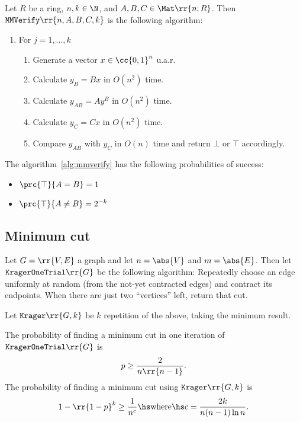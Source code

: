 \documentclass{article}
\begin{document}
\begin{algorithm}\label{alg:mmverify}
  Let $R$ be a ring, $n,k\in\N$, and $A,B,C\in\Mat \rr{ n; R }$. Then
  $\texttt{MMVerify} \rr{ n, A, B, C, k }$ is the following algorithm:
  \begin{enumerate}
    \item For $j=1,...,k$ \begin{enumerate}
      \item Generate a vector $x\in \cc{ 0,1 }^n$ u.a.r.
      \item Calculate $y_B = Bx$ in $O(n^2)$ time.
      \item Calculate $y_{AB} = Ay^B$ in $O(n^2)$ time.
      \item Calculate $y_C = Cx$ in $O(n^2)$ time.
      \item Compare $y_{AB}$ with $y_C$ in $O(n)$ time and return $\bot$ or $\top$ accordingly.
    \end{enumerate}
\end{enumerate}
\end{algorithm}

\begin{theorem}
  \label{thm:mmverify-proabilities}
  The algorithm~\ref{alg:mmverify} has the following probabilities of success:
  \begin{itemize}
    \item $\prc{ \top}{A = B } = 1$
    \item $\prc{ \top}{A \not= B } = 2^{-k}$
  \end{itemize}
\end{theorem}


\subsection{Minimum cut}

\begin{algorithm}
  \label{alg:krager}
  Let $G= \rr{ V,E }$ a graph and let $n= \abs{ V }$ and $m= \abs{ E }$. Then let
  $\texttt{KragerOneTrial} \rr{ G }$ be the following algorithm: Repeatedly choose an edge
  uniformly at random (from the not-yet contracted edges) and contract its endpoints.
  When there are just two “vertices” left, return that cut.

  Let $ \texttt{Krager} \rr{ G, k }$ be $k$ repetition of the above, taking the minimum
  result.
\end{algorithm}

\begin{theorem}
  \label{thm:krager-probabilities}
  The probability of finding a minimum cut in one iteration of $ \texttt{KragerOneTrial} \rr{ G }$
  is
  \begin{align*}
    p \geq \frac{2}{n \rr{ n-1 }}.
  \end{align*}
  The probability of finding a minimum cut using $ \texttt{Krager} \rr{ G,k }$ is
  \begin{align*}
    1-\rr{ 1-p }^k \geq \frac{1}{n^c} \hs \text{where} \hs c = \frac{2k}{n(n-1)\ln n}.
  \end{align*}
\end{theorem}
\end{document}
